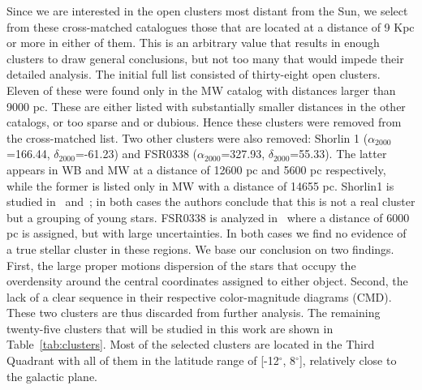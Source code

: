 \documentclass{aa}
\begin{document}
 Since we are interested in the open clusters most distant from the Sun, we
 select from these cross-matched catalogues those that are located at a
 distance of 9 Kpc or more in either of them. This is an arbitrary value that
 results in enough clusters to draw general conclusions, but not too many that
 would impede their detailed analysis.
 The initial full list consisted of thirty-eight open clusters. Eleven of these
 were found only in the MW catalog with distances larger than 9000 pc. These are
 either listed with substantially smaller distances in the other catalogs, or
 too sparse and or dubious. Hence these clusters were removed from the
 cross-matched list.
 Two other clusters were also removed: Shorlin 1 ($\alpha_{2000}$=166.44,
 $\delta_{2000}$=-61.23) and FSR0338
 ($\alpha_{2000}$=327.93, $\delta_{2000}$=55.33). The latter appears in WB and
 MW at a distance of 12600 pc and 5600 pc respectively, while the former is
 listed only in MW with a distance of 14655 pc. Shorlin1 is studied
 in~\cite{Carraro_2009} and~\cite{Turner_2012}; in both cases the authors
 conclude that this is not a real cluster but a grouping of young stars.
 FSR0338 is analyzed in~\cite{Froebrich_2010} where a distance of 6000 pc is
 assigned, but with large uncertainties.
 In both cases we find no evidence of a true stellar cluster in these regions.
 We base our conclusion on two findings. First, the large proper motions
 dispersion of the stars that occupy the overdensity around the central
 coordinates assigned to either object. Second, the lack of a clear sequence in
 their respective color-magnitude diagrams (CMD). These two clusters are thus
 discarded from further analysis. The remaining twenty-five clusters that will
 be studied in this work are shown in Table~\ref{tab:clusters}. Most of the
 selected clusters are located in the Third Quadrant with all of them in the
 latitude range of [-12$^{\circ}$, 8$^{\circ}$], relatively close to the
 galactic plane.
\end{document}
